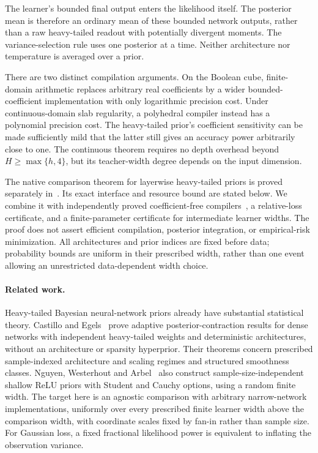 \documentclass[11pt]{article}
\begin{document}
The learner's bounded final output enters the likelihood itself. The posterior mean is therefore an ordinary mean of these bounded network outputs, rather than a raw heavy-tailed readout with potentially divergent moments. The variance-selection rule uses one posterior at a time. Neither architecture nor temperature is averaged over a prior.

There are two distinct compilation arguments. On the Boolean cube, finite-domain arithmetic replaces arbitrary real coefficients by a wider bounded-coefficient implementation with only logarithmic precision cost. Under continuous-domain slab regularity, a polyhedral compiler instead has a polynomial precision cost. The heavy-tailed prior's coefficient sensitivity can be made sufficiently mild that the latter still gives an accuracy power arbitrarily close to one. The continuous theorem requires no depth overhead beyond $H\ge\max\{h,4\}$, but its teacher-width degree depends on the input dimension.

The native comparison theorem for layerwise heavy-tailed priors is proved separately in~\cite{layerwise}. Its exact interface and resource bound are stated below. We combine it with independently proved coefficient-free compilers~\cite{boolean,regular}, a relative-loss certificate, and a finite-parameter certificate for intermediate learner widths. The proof does not assert efficient compilation, posterior integration, or empirical-risk minimization. All architectures and prior indices are fixed before data; probability bounds are uniform in their prescribed width, rather than one event allowing an unrestricted data-dependent width choice.

\paragraph{Related work.}
Heavy-tailed Bayesian neural-network priors already have substantial statistical theory. Castillo and Egels~\cite{castillo-egels} prove adaptive posterior-contraction results for dense networks with independent heavy-tailed weights and deterministic architectures, without an architecture or sparsity hyperprior. Their theorems concern prescribed sample-indexed architecture and scaling regimes and structured smoothness classes. Nguyen, Westerhout and Arbel~\cite{nguyen} also construct sample-size-independent shallow ReLU priors with Student and Cauchy options, using a random finite width. The target here is an agnostic comparison with arbitrary narrow-network implementations, uniformly over every prescribed finite learner width above the comparison width, with coordinate scales fixed by fan-in rather than sample size. For Gaussian loss, a fixed fractional likelihood power is equivalent to inflating the observation variance.
\end{document}
